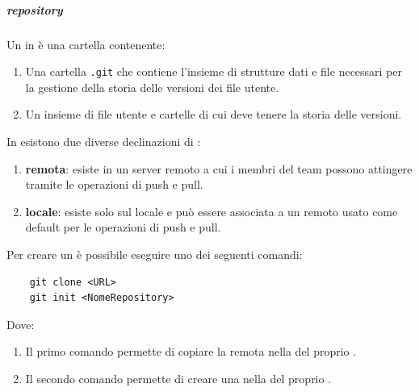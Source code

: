 \subparagraph{repository}
Un  in  è una cartella contenente:
\begin{enumerate}
    \item Una cartella \texttt{.git} che contiene l'insieme di strutture dati e file necessari per la gestione della storia delle versioni dei file utente.
    \item Un insieme di file utente e cartelle di cui  deve tenere la storia delle versioni.
\end{enumerate}
In  esistono due diverse declinazioni di :
\begin{enumerate}
    \item \textbf{remota}: esiste in un server remoto a cui i membri del team possono attingere tramite le operazioni di push e pull.
    
    \item \textbf{locale}: esiste solo sul  locale e può essere associata a un  remoto usato come default per le operazioni di push e pull. 
\end{enumerate} 
Per creare un  è possibile eseguire uno dei seguenti comandi:
\begin{lstlisting}
    git clone <URL>
    git init <NomeRepository>
\end{lstlisting}
Dove:
\begin{enumerate}
    \item Il primo comando permette di copiare la  remota nella  del proprio .
    \item Il secondo comando permette di creare una  nella  del proprio .
\end{enumerate}

